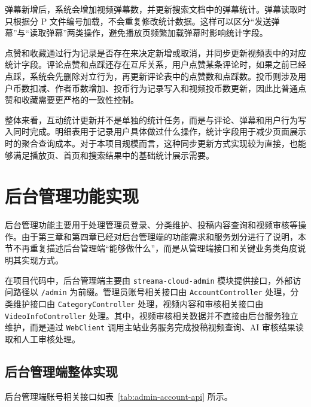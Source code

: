 弹幕新增后，系统会增加视频弹幕数，并更新搜索文档中的弹幕统计。弹幕读取时只根据分 P 文件编号加载，不会重复修改统计数据。这样可以区分“发送弹幕”与“读取弹幕”两类操作，避免播放页频繁加载弹幕时影响统计字段。

点赞和收藏通过行为记录是否存在来决定新增或取消，并同步更新视频表中的对应统计字段。评论点赞和点踩还存在互斥关系，用户点赞某条评论时，如果之前已经点踩，系统会先删除对立行为，再更新评论表中的点赞数和点踩数。投币则涉及用户币数扣减、作者币数增加、投币行为记录写入和视频投币数更新，因此比普通点赞和收藏需要更严格的一致性控制。

整体来看，互动统计更新并不是单独的统计任务，而是与评论、弹幕和用户行为写入同时完成。明细表用于记录用户具体做过什么操作，统计字段用于减少页面展示时的聚合查询成本。对于本项目规模而言，这种同步更新方式实现较为直接，也能够满足播放页、首页和搜索结果中的基础统计展示需要。

\section{后台管理功能实现}

后台管理功能主要用于处理管理员登录、分类维护、投稿内容查询和视频审核等操作。由于第三章和第四章已经对后台管理端的功能需求和服务划分进行了说明，本节不再重复描述后台管理端“能够做什么”，而是从管理端接口和关键业务类角度说明其实现方式。

在项目代码中，后台管理端主要由 \texttt{streama-cloud-admin} 模块提供接口，外部访问路径以 \texttt{/admin} 为前缀。管理员账号相关接口由 \texttt{AccountController} 处理，分类维护接口由 \texttt{CategoryController} 处理，视频内容和审核相关接口由 \texttt{VideoInfoController} 处理。其中，视频审核相关数据并不直接由后台服务独立维护，而是通过 \texttt{WebClient} 调用主站业务服务完成投稿视频查询、AI 审核结果读取和人工审核处理。

\subsection{后台管理端整体实现}

后台管理端账号相关接口如表~\ref{tab:admin-account-api} 所示。

